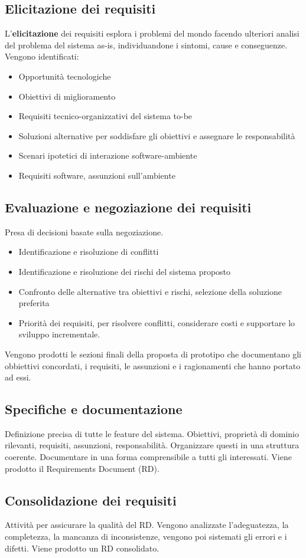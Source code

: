 \documentclass[../main.tex]{subfiles}
\begin{document}
\subsection{Elicitazione dei requisiti}
L'\textbf{elicitazione} dei requisiti esplora i problemi del mondo facendo ulteriori analisi del problema del sistema as-is, individuandone i sintomi, cause e conseguenze.
Vengono identificati:
\begin{itemize}
	\item Opportunità tecnologiche
	\item Obiettivi di miglioramento
	\item Requisiti tecnico-organizzativi del sistema to-be
	\item Soluzioni alternative per soddisfare gli obiettivi e assegnare le responsabilità
	\item Scenari ipotetici di interazione software-ambiente
	\item Requisiti software, assunzioni sull'ambiente
\end{itemize}
\subsection{Evaluazione e negoziazione dei requisiti}
Presa di decisioni basate sulla negoziazione. 
\begin{itemize}
	\item Identificazione e risoluzione di conflitti 
	\item Identificazione e risoluzione dei rischi del sistema proposto
	\item Confronto delle alternative tra obiettivi e rischi, selezione della soluzione preferita
	\item Priorità dei requisiti, per risolvere conflitti, considerare costi e supportare lo sviluppo incrementale.
\end{itemize}
Vengono prodotti le sezioni finali della proposta di prototipo che documentano gli obbiettivi concordati, i requisiti, le assunzioni e i ragionamenti che hanno portato ad essi.
\subsection{Specifiche e documentazione}
Definizione precisa di tutte le feature del sistema.
Obiettivi, proprietà di dominio rilevanti, requisiti, assunzioni, responsabilità.
Organizzare questi in una struttura coerente. Documentare in una forma comprensibile a tutti gli interessati. Viene prodotto il Requirements Document (RD).
\subsection{Consolidazione dei requisiti}
Attività per assicurare la qualità del RD. Vengono analizzate l'adeguatezza, la completezza, la mancanza di inconsistenze, vengono poi sistemati gli errori e i difetti. Viene prodotto un RD consolidato.
\end{document}
